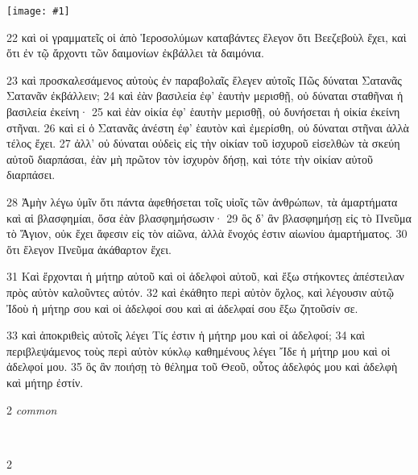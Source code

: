 \documentclass[10pt,a5paper,twoside,twocolumn]{book}
\newcommand{\fig}[1]{\texttt{[image: \#1]}\label{fig:#1}}
\newcommand*\cleartoleftpage{%
  \ifodd\value{page}\hbox{}\clearpage\fi
}
\newcommand{\separator}{\hspace{0.27\textwidth}\noindent\makebox[\linewidth]{\resizebox{0.3333\linewidth}{1pt}{$\bullet$}}\bigskip}
\newenvironment{facing}{\cleartoleftpage}{\clearpage\pagebreak}
\newenvironment{help}{\clearpage}{}
\newenvironment{helpsec}{\begin{minipage}[t]{\textwidth}\begin{multicols}{2}}{\end{multicols}\end{minipage}}
\newenvironment{vocab}{\begin{helpsec}}{\end{helpsec}}
\newenvironment{translation}{\separator\\\begin{helpsec}\footnotesize}{\end{helpsec}}
\begin{document}
\begin{facing}

\fig{03-22} %

22 καὶ οἱ γραμματεῖς οἱ ἀπὸ Ἱεροσολύμων καταβάντες ἔλεγον ὅτι Βεεζεβοὺλ ἔχει, καὶ ὅτι ἐν τῷ ἄρχοντι τῶν δαιμονίων ἐκβάλλει τὰ δαιμόνια. 

23 καὶ προσκαλεσάμενος αὐτοὺς ἐν παραβολαῖς ἔλεγεν αὐτοῖς Πῶς δύναται Σατανᾶς Σατανᾶν ἐκβάλλειν; 24 καὶ ἐὰν βασιλεία ἐφ’ ἑαυτὴν μερισθῇ, οὐ δύναται σταθῆναι ἡ βασιλεία ἐκείνη· 25 καὶ ἐὰν οἰκία ἐφ’ ἑαυτὴν μερισθῇ, οὐ δυνήσεται ἡ οἰκία ἐκείνη στῆναι. 26 καὶ εἰ ὁ Σατανᾶς ἀνέστη ἐφ’ ἑαυτὸν καὶ ἐμερίσθη, οὐ δύναται στῆναι ἀλλὰ τέλος ἔχει. 27 ἀλλ’ οὐ δύναται οὐδεὶς εἰς τὴν οἰκίαν τοῦ ἰσχυροῦ εἰσελθὼν τὰ σκεύη αὐτοῦ διαρπάσαι, ἐὰν μὴ πρῶτον τὸν ἰσχυρὸν δήσῃ, καὶ τότε τὴν οἰκίαν αὐτοῦ διαρπάσει. 

28 Ἀμὴν λέγω ὑμῖν ὅτι πάντα ἀφεθήσεται τοῖς υἱοῖς τῶν ἀνθρώπων, τὰ ἁμαρτήματα καὶ αἱ βλασφημίαι, ὅσα ἐὰν βλασφημήσωσιν· 29 ὃς δ’ ἂν βλασφημήσῃ εἰς τὸ Πνεῦμα τὸ Ἅγιον, οὐκ ἔχει ἄφεσιν εἰς τὸν αἰῶνα, ἀλλὰ ἔνοχός ἐστιν αἰωνίου ἁμαρτήματος. 30 ὅτι ἔλεγον Πνεῦμα ἀκάθαρτον ἔχει. 

31 Καὶ ἔρχονται ἡ μήτηρ αὐτοῦ καὶ οἱ ἀδελφοὶ αὐτοῦ, καὶ ἔξω στήκοντες ἀπέστειλαν πρὸς αὐτὸν καλοῦντες αὐτόν. 32 καὶ ἐκάθητο περὶ αὐτὸν ὄχλος, καὶ λέγουσιν αὐτῷ Ἰδοὺ ἡ μήτηρ σου καὶ οἱ ἀδελφοί σου καὶ αἱ ἀδελφαί σου ἔξω ζητοῦσίν σε. 

33 καὶ ἀποκριθεὶς αὐτοῖς λέγει Τίς ἐστιν ἡ μήτηρ μου καὶ οἱ ἀδελφοί; 34 καὶ περιβλεψάμενος τοὺς περὶ αὐτὸν κύκλῳ καθημένους λέγει Ἴδε ἡ μήτηρ μου καὶ οἱ ἀδελφοί μου. 35 ὃς ἂν ποιήσῃ τὸ θέλημα τοῦ Θεοῦ, οὗτος ἀδελφός μου καὶ ἀδελφὴ καὶ μήτηρ ἐστίν.


\begin{help}
\begin{vocab}
\emph{common}\\

\end{vocab}
\begin{translation}

\end{translation}
\end{help}
\end{facing}
\end{document}
